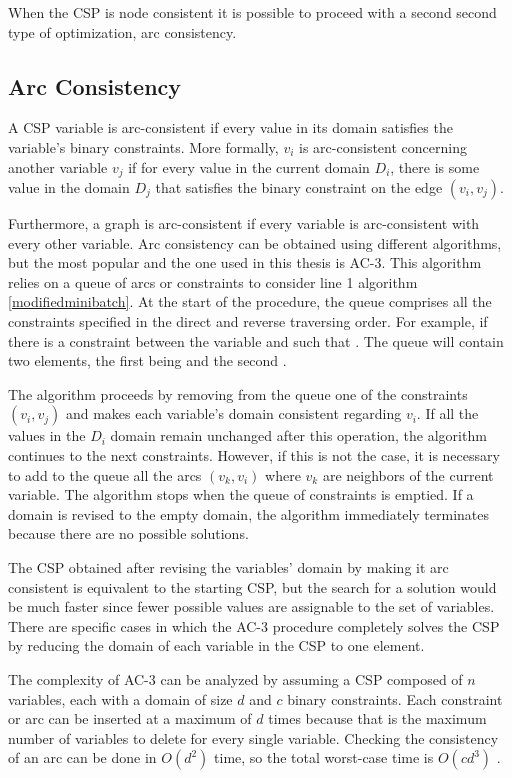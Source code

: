 When the CSP is node consistent it is possible to proceed with a second second
type of optimization, arc consistency.

\subsection{Arc Consistency}
A CSP variable is arc-consistent if every value in its domain satisfies the
variable's binary constraints. More formally, $v_i$ is arc-consistent concerning
another variable $v_j$ if for every value in the current domain $D_i$, there is
some value in the domain $D_j$ that satisfies the binary constraint on the edge
$(v_i, v_j)$.

Furthermore, a graph is arc-consistent if every variable is arc-consistent with
every other variable. Arc consistency can be obtained using different
algorithms, but the most popular and the one used in this thesis is AC-3. This
algorithm relies on a queue of arcs or constraints to consider line 1 algorithm
\ref{modifiedminibatch}. At the start of the procedure, the queue comprises all
the constraints specified in the direct and reverse traversing order. For
example, if there is a constraint between the variable  and 
such that . The queue will contain two elements, the first being
 and the second .

The algorithm proceeds by removing from the queue one of the constraints $(v_i,
v_j)$ and makes each variable's domain consistent regarding $v_i$. If all the
values in the $D_i$ domain remain unchanged after this operation, the algorithm
continues to the next constraints. However, if this is not the case, it is
necessary to add to the queue all the arcs $(v_k, v_i)$ where $v_k$ are
neighbors of the current variable. The algorithm stops when the queue of
constraints is emptied. If a domain is revised to the empty domain, the
algorithm immediately terminates because there are no possible solutions.

The CSP obtained after revising the variables' domain by making it arc
consistent is equivalent to the starting CSP, but the search for a solution
would be much faster since fewer possible values are assignable to the set of
variables. There are specific cases in which the AC-3 procedure completely
solves the CSP by reducing the domain of each variable in the CSP to one
element.

The complexity of AC-3 can be analyzed by assuming a CSP composed of $n$
variables, each with a domain of size $d$ and $c$ binary constraints. Each
constraint or arc can be inserted at a maximum of $d$ times because that is the
maximum number of variables to delete for every single variable. Checking the
consistency of an arc can be done in $O(d^2)$ time, so the total worst-case time
is $O(cd^3)$ \cite{russell2002artificial}.

